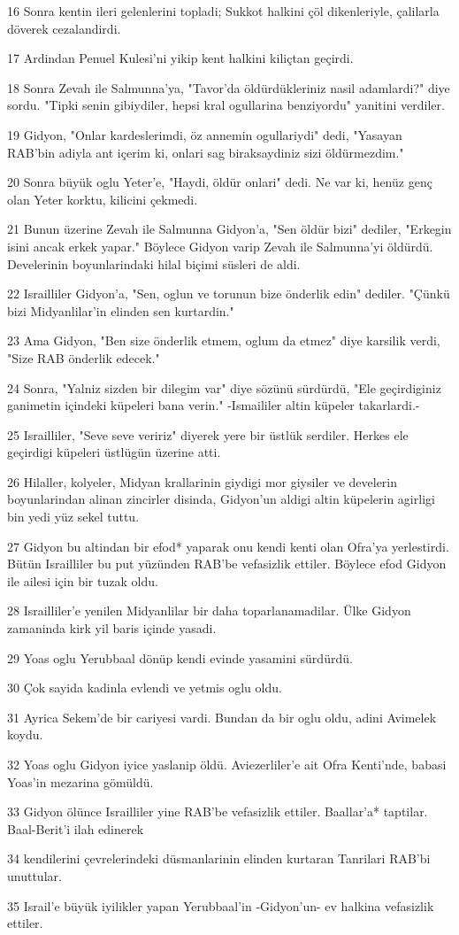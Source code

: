 \par 16 Sonra kentin ileri gelenlerini topladi; Sukkot halkini çöl dikenleriyle, çalilarla döverek cezalandirdi.
\par 17 Ardindan Penuel Kulesi'ni yikip kent halkini kiliçtan geçirdi.
\par 18 Sonra Zevah ile Salmunna'ya, "Tavor'da öldürdükleriniz nasil adamlardi?" diye sordu. "Tipki senin gibiydiler, hepsi kral ogullarina benziyordu" yanitini verdiler.
\par 19 Gidyon, "Onlar kardeslerimdi, öz annemin ogullariydi" dedi, "Yasayan RAB'bin adiyla ant içerim ki, onlari sag biraksaydiniz sizi öldürmezdim."
\par 20 Sonra büyük oglu Yeter'e, "Haydi, öldür onlari" dedi. Ne var ki, henüz genç olan Yeter korktu, kilicini çekmedi.
\par 21 Bunun üzerine Zevah ile Salmunna Gidyon'a, "Sen öldür bizi" dediler, "Erkegin isini ancak erkek yapar." Böylece Gidyon varip Zevah ile Salmunna'yi öldürdü. Develerinin boyunlarindaki hilal biçimi süsleri de aldi.
\par 22 Israilliler Gidyon'a, "Sen, oglun ve torunun bize önderlik edin" dediler. "Çünkü bizi Midyanlilar'in elinden sen kurtardin."
\par 23 Ama Gidyon, "Ben size önderlik etmem, oglum da etmez" diye karsilik verdi, "Size RAB önderlik edecek."
\par 24 Sonra, "Yalniz sizden bir dilegim var" diye sözünü sürdürdü, "Ele geçirdiginiz ganimetin içindeki küpeleri bana verin." -Ismaililer altin küpeler takarlardi.-
\par 25 Israilliler, "Seve seve veririz" diyerek yere bir üstlük serdiler. Herkes ele geçirdigi küpeleri üstlügün üzerine atti.
\par 26 Hilaller, kolyeler, Midyan krallarinin giydigi mor giysiler ve develerin boyunlarindan alinan zincirler disinda, Gidyon'un aldigi altin küpelerin agirligi bin yedi yüz sekel tuttu.
\par 27 Gidyon bu altindan bir efod* yaparak onu kendi kenti olan Ofra'ya yerlestirdi. Bütün Israilliler bu put yüzünden RAB'be vefasizlik ettiler. Böylece efod Gidyon ile ailesi için bir tuzak oldu.
\par 28 Israilliler'e yenilen Midyanlilar bir daha toparlanamadilar. Ülke Gidyon zamaninda kirk yil baris içinde yasadi.
\par 29 Yoas oglu Yerubbaal dönüp kendi evinde yasamini sürdürdü.
\par 30 Çok sayida kadinla evlendi ve yetmis oglu oldu.
\par 31 Ayrica Sekem'de bir cariyesi vardi. Bundan da bir oglu oldu, adini Avimelek koydu.
\par 32 Yoas oglu Gidyon iyice yaslanip öldü. Aviezerliler'e ait Ofra Kenti'nde, babasi Yoas'in mezarina gömüldü.
\par 33 Gidyon ölünce Israilliler yine RAB'be vefasizlik ettiler. Baallar'a* taptilar. Baal-Berit'i ilah edinerek
\par 34 kendilerini çevrelerindeki düsmanlarinin elinden kurtaran Tanrilari RAB'bi unuttular.
\par 35 Israil'e büyük iyilikler yapan Yerubbaal'in -Gidyon'un- ev halkina vefasizlik ettiler.

